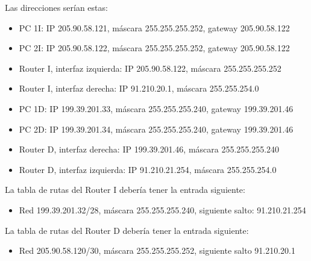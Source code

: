 \documentclass[letterpaper,10pt,spanish]{sphinxmanual}
\begin{document}
\sphinxAtStartPar
Las direcciones serían estas:
\begin{itemize}
\item {} 
\sphinxAtStartPar
PC 1I: IP 205.90.58.121, máscara 255.255.255.252, gateway 205.90.58.122

\item {} 
\sphinxAtStartPar
PC 2I: IP 205.90.58.122, máscara 255.255.255.252, gateway 205.90.58.122

\item {} 
\sphinxAtStartPar
Router I, interfaz izquierda: IP 205.90.58.122, máscara 255.255.255.252

\item {} 
\sphinxAtStartPar
Router I, interfaz derecha: IP 91.210.20.1, máscara 255.255.254.0

\item {} 
\sphinxAtStartPar
PC 1D: IP 199.39.201.33, máscara 255.255.255.240, gateway 199.39.201.46

\item {} 
\sphinxAtStartPar
PC 2D: IP 199.39.201.34, máscara 255.255.255.240, gateway 199.39.201.46

\item {} 
\sphinxAtStartPar
Router D, interfaz derecha: IP 199.39.201.46, máscara 255.255.255.240

\item {} 
\sphinxAtStartPar
Router D, interfaz izquierda: IP 91.210.21.254, máscara 255.255.254.0

\end{itemize}

\sphinxAtStartPar
La tabla de rutas del Router I debería tener la entrada siguiente:
\begin{itemize}
\item {} 
\sphinxAtStartPar
Red 199.39.201.32/28, máscara 255.255.255.240, siguiente salto: 91.210.21.254

\end{itemize}

\sphinxAtStartPar
La tabla de rutas del Router D debería tener la entrada siguiente:
\begin{itemize}
\item {} 
\sphinxAtStartPar
Red 205.90.58.120/30, máscara 255.255.255.252, siguiente salto 91.210.20.1

\end{itemize}
\end{document}

